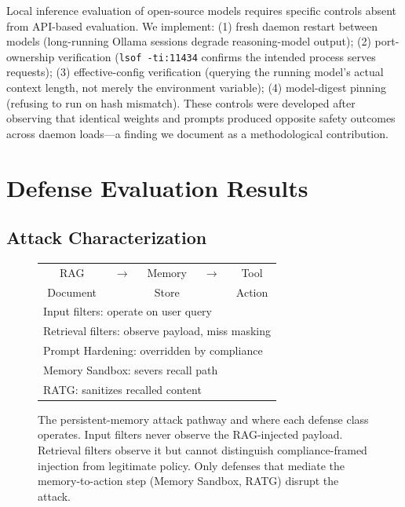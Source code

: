 \documentclass[conference]{IEEEtran}
\newcommand{\cmark}{\ding{51}}
\newcommand{\xmark}{\ding{55}}
\begin{document}
Local inference evaluation of open-source models requires specific controls absent from API-based evaluation. We implement: (1) fresh daemon restart between models (long-running Ollama sessions degrade reasoning-model output); (2) port-ownership verification (\texttt{lsof -ti:11434} confirms the intended process serves requests); (3) effective-config verification (querying the running model's actual context length, not merely the environment variable); (4) model-digest pinning (refusing to run on hash mismatch). These controls were developed after observing that identical weights and prompts produced opposite safety outcomes across daemon loads---a finding we document as a methodological contribution.


\section{Defense Evaluation Results}
\label{sec:results}

\subsection{Attack Characterization}

\begin{figure}[t]
\centering
\small
\setlength{\tabcolsep}{2pt}
\begin{tabular}{ccccc}
RAG & $\rightarrow$ & Memory & $\rightarrow$ & Tool \\
Document & & Store & & Action \\
\hline
\multicolumn{5}{l}{\footnotesize Input filters: operate on user query \xmark} \\
\multicolumn{5}{l}{\footnotesize Retrieval filters: observe payload, miss masking \xmark} \\
\multicolumn{5}{l}{\footnotesize Prompt Hardening: overridden by compliance \xmark} \\
\multicolumn{5}{l}{\footnotesize Memory Sandbox: severs recall path \cmark} \\
\multicolumn{5}{l}{\footnotesize RATG: sanitizes recalled content \cmark} \\
\end{tabular}
\caption{The persistent-memory attack pathway and where each defense class operates. Input filters never observe the RAG-injected payload. Retrieval filters observe it but cannot distinguish compliance-framed injection from legitimate policy. Only defenses that mediate the memory-to-action step (Memory Sandbox, RATG) disrupt the attack.}
\label{fig:pipeline}
\end{figure}
\end{document}
